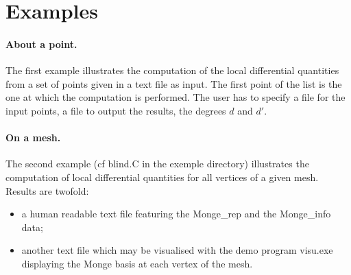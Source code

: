 \section{Examples} 

\paragraph{About a point.}
The first example illustrates the computation of the local
differential quantities from a set of points given in a text file as
input. The first point of the list is the one at which the computation
is performed. The user has to specify a file for the input points, a
file to output the results, the degrees $d$ and $d'$.

\paragraph{On a mesh.}
The second example (cf blind.C in the exemple directory) illustrates
the computation of local differential quantities for all vertices of a
given mesh. Results are twofold:
\begin{itemize}
\item
a human readable text file featuring the Monge\_rep and the Monge\_info data;
\item
another text file which may be visualised with the demo program
visu.exe displaying the Monge basis at each vertex of the mesh.
\end{itemize}

